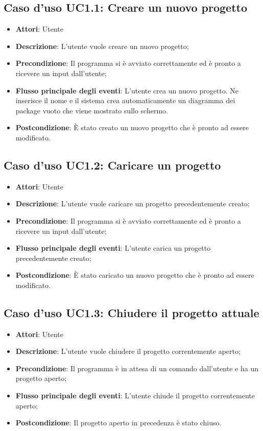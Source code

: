 \documentclass[../AnalisiDeiRequisiti.tex]{subfiles}
\begin{document}
	\subsection{Caso d'uso UC1.1: Creare un nuovo progetto}
	\begin{itemize}
		\item \textbf{Attori}: Utente
		\item \textbf{Descrizione}: L'utente vuole creare un nuovo progetto;
		\item \textbf{Precondizione}: Il programma si è avviato correttamente ed è pronto a ricevere un input dall'utente;
		\item \textbf{Flusso principale degli eventi}: L'utente crea un nuovo progetto. Ne inserisce il nome e il sistema crea automaticamente un diagramma dei package vuoto che viene mostrato sullo schermo.
		\item \textbf{Postcondizione}: È stato creato un nuovo progetto che è pronto ad essere modificato.
	\end{itemize}
	\subsection{Caso d'uso UC1.2: Caricare un progetto}
	\begin{itemize}
		\item \textbf{Attori}: Utente
		\item \textbf{Descrizione}: L'utente vuole caricare un progetto precedentemente creato;
		\item \textbf{Precondizione}: Il programma si è avviato correttamente ed è pronto a ricevere un input dall'utente;
		\item \textbf{Flusso principale degli eventi}: L'utente carica un progetto precedentemente creato;
		\item \textbf{Postcondizione}: È stato caricato un nuovo progetto che è pronto ad essere modificato.
	\end{itemize}
	\subsection{Caso d'uso UC1.3: Chiudere il progetto attuale}
	\begin{itemize}
		\item \textbf{Attori}: Utente
		\item \textbf{Descrizione}: L'utente vuole chiudere il progetto correntemente aperto;
		\item \textbf{Precondizione}: Il programma è in attesa di un comando dall'utente e ha un progetto aperto;
		\item \textbf{Flusso principale degli eventi}: L'utente chiude il progetto correntemente aperto;
		\item \textbf{Postcondizione}: Il progetto aperto in precedenza è stato chiuso.
	\end{itemize}
\end{document}
